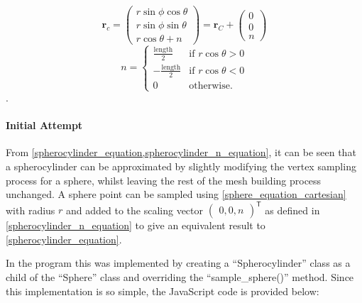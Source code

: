 \begin{equation}
\mathbf{r}_{c}=\begin{pmatrix}r\sin\phi \cos\theta\\
r\sin\phi \sin\theta\\
r\cos\theta + n\end{pmatrix}
=\mathbf{r}_{C}+\begin{pmatrix}0\\
0\\
n\end{pmatrix}
\label{spherocylinder_equation}
\end{equation}
\begin{equation}
n=\begin{cases}
  \frac{\text{length}}{2}&\text{if } r\cos\theta>0\\
  -\frac{\text{length}}{2}&\text{if } r\cos\theta<0\\
  0&\text{otherwise.}
\end{cases}
\label{spherocylinder_n_equation}
\end{equation}.
\paragraph{Initial Attempt}

From \cref{spherocylinder_equation,spherocylinder_n_equation}, it can be seen that a spherocylinder can be approximated by slightly modifying the vertex sampling process for a sphere, whilst leaving the rest of the mesh building process unchanged. A sphere point can be sampled using \cref{sphere_equation_cartesian} with radius $r$ and added to the scaling vector $\begin{pmatrix}0,0,n\end{pmatrix}^\mathsf{T}$ as defined in \cref{spherocylinder_n_equation} to give an equivalent result to \cref{spherocylinder_equation}.

In the program this was implemented by creating a ``Spherocylinder'' class as a child of the ``Sphere'' class and overriding the ``sample\_sphere()'' method. Since this implementation is so simple, the JavaScript code is provided below:

